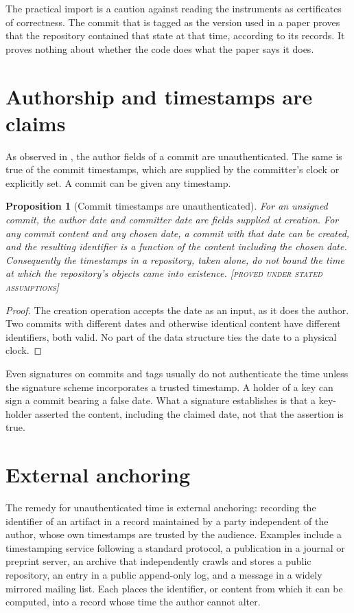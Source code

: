 \documentclass[11pt,twoside,openright]{book}
\theoremstyle{plain}
\newtheorem{proposition}[theorem]{Proposition}
\theoremstyle{definition}
\theoremstyle{remark}
\newcommand{\Proved}{\textup{\textsc{[proved under stated assumptions]}}}
\begin{document}
The practical import is a caution against reading the instruments as certificates of correctness. The commit that is tagged as the version used in a paper proves that the repository contained that state at that time, according to its records. It proves nothing about whether the code does what the paper says it does.

\section{Authorship and timestamps are claims}

As observed in , the author fields of a commit are unauthenticated. The same is true of the commit timestamps, which are supplied by the committer's clock or explicitly set. A commit can be given any timestamp.

\begin{proposition}[Commit timestamps are unauthenticated]\label{prop:timestamp}
For an unsigned commit, the author date and committer date are fields supplied at creation. For any commit content and any chosen date, a commit with that date can be created, and the resulting identifier is a function of the content including the chosen date. Consequently the timestamps in a repository, taken alone, do not bound the time at which the repository's objects came into existence.
\Proved{}
\end{proposition}

\begin{proof}
The creation operation accepts the date as an input, as it does the author. Two commits with different dates and otherwise identical content have different identifiers, both valid. No part of the data structure ties the date to a physical clock.
\end{proof}

Even signatures on commits and tags usually do not authenticate the time unless the signature scheme incorporates a trusted timestamp. A holder of a key can sign a commit bearing a false date. What a signature establishes is that a key-holder asserted the content, including the claimed date, not that the assertion is true.

\section{External anchoring}

The remedy for unauthenticated time is external anchoring: recording the identifier of an artifact in a record maintained by a party independent of the author, whose own timestamps are trusted by the audience. Examples include a timestamping service following a standard protocol, a publication in a journal or preprint server, an archive that independently crawls and stores a public repository, an entry in a public append-only log, and a message in a widely mirrored mailing list. Each places the identifier, or content from which it can be computed, into a record whose time the author cannot alter.
\end{document}
